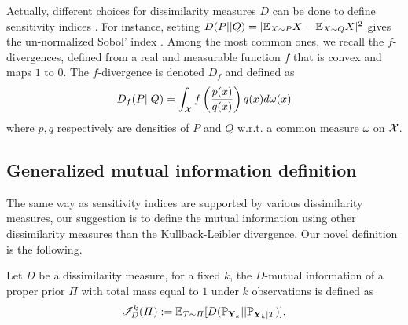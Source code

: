 Actually, different choices for dissimilarity measures $D$ can be done to define sensitivity indices \citep{da_veiga_global_2015}. For instance, setting $D(P||Q)=|\mathbb{E}_{X\sim P}X-\mathbb{E}_{X\sim Q}X|^2$ gives the un-normalized Sobol’ index \citep{sobol_sensitivity_1993}.
Among the most common ones, we recall the $f$-divergences, defined from a real and measurable function $f$ that is convex and maps $1$ to $0$. The $f$-divergence is denoted $D_f$ and defined as 
    \begin{equation}
        D_f(P||Q) = \int_{\mathcal{X}} f\left(\frac{p(x)}{q(x)}\right) q(x) d\omega(x)
    \end{equation}
where $p,q$ respectively are densities of $P$ and $Q$  w.r.t. a common measure $\omega$ on $\mathcal{X}$.







\subsection{Generalized mutual information definition}


The same way as sensitivity indices are supported by various dissimilarity measures, our suggestion is to define the mutual information using other dissimilarity measures than the Kullback-Leibler divergence.
Our novel definition is the following.
\begin{defi}
    Let $D$ be a dissimilarity measure, for a fixed $k$, the $D$-mutual information of a proper prior $\varPi$ with total mass equal to $1$ under $k$ observations is defined as
        \begin{equation}
            \mathscr{I}_D^k(\varPi) := \mathbb{E}_{T\sim\varPi}[D(\mathbb{P}_{\mathbf{Y}_k}||\mathbb{P}_{\mathbf{Y}_k|T} )].
        \end{equation}
\end{defi}

